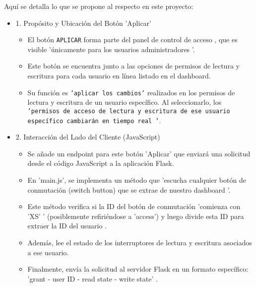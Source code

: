 \documentclass{report}
\begin{document}
Aquí se detalla lo que se propone al respecto en este proyecto:
\begin{itemize}
    \item 1. Propósito y Ubicación del Botón 'Aplicar'
    \begin{itemize}
        \item El botón \texttt{APLICAR} forma parte del  panel de control de acceso , que es visible  'únicamente para los usuarios administradores '.
        \item Este botón se encuentra junto a las opciones de permisos de lectura y escritura para cada usuario en línea listado en el dashboard.
        \item Su función es \texttt{'aplicar los cambios'} realizados en los permisos de lectura y escritura de un usuario específico. Al seleccionarlo, 
                  los \texttt{ 'permisos de acceso de lectura y escritura de ese usuario específico cambiarán en tiempo real '}.    
    \end{itemize}

    \item 2. Interacción del Lado del Cliente (JavaScript)
    \begin{itemize}
        \item Se añade un  endpoint para este botón 'Aplicar'  que enviará una solicitud desde el código JavaScript a la aplicación Flask.
        \item En 'main.js', se implementa un método que  'escucha cualquier botón de conmutación (switch button) que se extrae de nuestro dashboard '.
        \item Este método verifica si la ID del botón de conmutación  'comienza con 'XS' ' (posiblemente refiriéndose a 'access') y luego  divide esta ID 
        para extraer la ID del usuario .
        \item Además, lee el  estado de los interruptores de lectura y escritura  asociados a ese usuario.
        \item Finalmente, envía la solicitud al servidor Flask en un formato específico:  'grant - user ID - read state - write state' .    
    \end{itemize}


\end{itemize}
\end{document}
